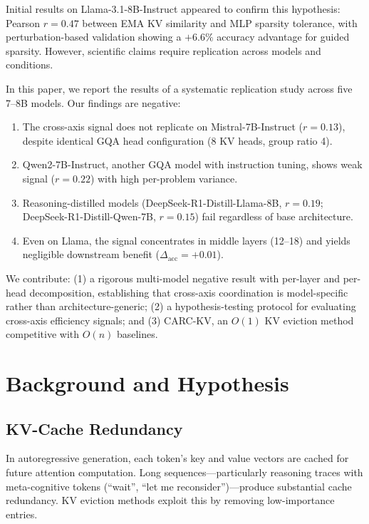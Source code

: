 \documentclass[11pt]{article}
\begin{document}
Initial results on Llama-3.1-8B-Instruct appeared to confirm this hypothesis: Pearson $r{=}0.47$ between EMA KV similarity and MLP sparsity tolerance, with perturbation-based validation showing a $+6.6\%$ accuracy advantage for guided sparsity. However, scientific claims require replication across models and conditions.

In this paper, we report the results of a systematic replication study across five 7--8B models. Our findings are negative:

\begin{enumerate}
    \item The cross-axis signal does not replicate on Mistral-7B-Instruct ($r{=}0.13$), despite identical GQA head configuration (8 KV heads, group ratio 4).
    \item Qwen2-7B-Instruct, another GQA model with instruction tuning, shows weak signal ($r{=}0.22$) with high per-problem variance.
    \item Reasoning-distilled models (DeepSeek-R1-Distill-Llama-8B, $r{=}0.19$; DeepSeek-R1-Distill-Qwen-7B, $r{=}0.15$) fail regardless of base architecture.
    \item Even on Llama, the signal concentrates in middle layers (12--18) and yields negligible downstream benefit ($\Delta_\text{acc}{=}{+}0.01$).
\end{enumerate}

We contribute: (1) a rigorous multi-model negative result with per-layer and per-head decomposition, establishing that cross-axis coordination is model-specific rather than architecture-generic; (2) a hypothesis-testing protocol for evaluating cross-axis efficiency signals; and (3) CARC-KV, an $O(1)$ KV eviction method competitive with $O(n)$ baselines.

\section{Background and Hypothesis}

\subsection{KV-Cache Redundancy}

In autoregressive generation, each token's key and value vectors are cached for future attention computation. Long sequences---particularly reasoning traces with meta-cognitive tokens (``wait'', ``let me reconsider'')---produce substantial cache redundancy. KV eviction methods exploit this by removing low-importance entries.
\end{document}
